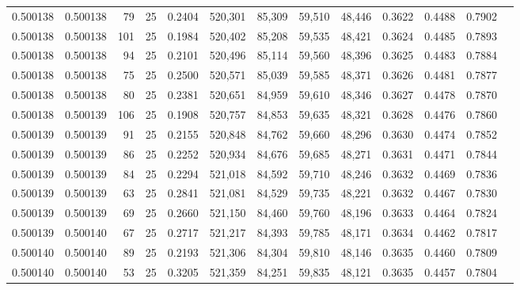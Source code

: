 \begin{tabular}{rrrrrrrrrrrrr}
0.500138 & 0.500138 &    79 &  25 &                                     0.2404 & 520,301 &  85,309 &  59,510 &  48,446 & 0.3622 & 0.4488 & 0.7902 \\
0.500138 & 0.500138 &   101 &  25 &                                     0.1984 & 520,402 &  85,208 &  59,535 &  48,421 & 0.3624 & 0.4485 & 0.7893 \\
0.500138 & 0.500138 &    94 &  25 &                                     0.2101 & 520,496 &  85,114 &  59,560 &  48,396 & 0.3625 & 0.4483 & 0.7884 \\
0.500138 & 0.500138 &    75 &  25 &                                     0.2500 & 520,571 &  85,039 &  59,585 &  48,371 & 0.3626 & 0.4481 & 0.7877 \\
0.500138 & 0.500138 &    80 &  25 &                                     0.2381 & 520,651 &  84,959 &  59,610 &  48,346 & 0.3627 & 0.4478 & 0.7870 \\
0.500138 & 0.500139 &   106 &  25 &                                     0.1908 & 520,757 &  84,853 &  59,635 &  48,321 & 0.3628 & 0.4476 & 0.7860 \\
0.500139 & 0.500139 &    91 &  25 &                                     0.2155 & 520,848 &  84,762 &  59,660 &  48,296 & 0.3630 & 0.4474 & 0.7852 \\
0.500139 & 0.500139 &    86 &  25 &                                     0.2252 & 520,934 &  84,676 &  59,685 &  48,271 & 0.3631 & 0.4471 & 0.7844 \\
0.500139 & 0.500139 &    84 &  25 &                                     0.2294 & 521,018 &  84,592 &  59,710 &  48,246 & 0.3632 & 0.4469 & 0.7836 \\
0.500139 & 0.500139 &    63 &  25 &                                     0.2841 & 521,081 &  84,529 &  59,735 &  48,221 & 0.3632 & 0.4467 & 0.7830 \\
0.500139 & 0.500139 &    69 &  25 &                                     0.2660 & 521,150 &  84,460 &  59,760 &  48,196 & 0.3633 & 0.4464 & 0.7824 \\
0.500139 & 0.500140 &    67 &  25 &                                     0.2717 & 521,217 &  84,393 &  59,785 &  48,171 & 0.3634 & 0.4462 & 0.7817 \\
0.500140 & 0.500140 &    89 &  25 &                                     0.2193 & 521,306 &  84,304 &  59,810 &  48,146 & 0.3635 & 0.4460 & 0.7809 \\
0.500140 & 0.500140 &    53 &  25 &                                     0.3205 & 521,359 &  84,251 &  59,835 &  48,121 & 0.3635 & 0.4457 & 0.7804 \\

\end{tabular}
